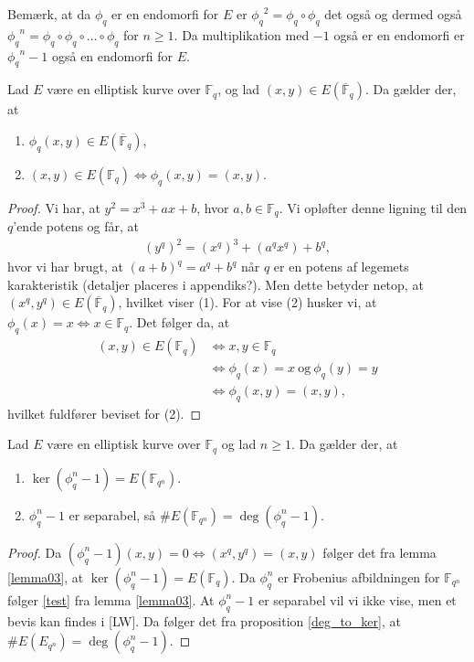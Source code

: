 Bemærk, at da $\phi_q$ er en endomorfi for $E$ er ${\phi_q}^2 = \phi_q \circ \phi_q$ det også og dermed også 
${\phi_q}^n = \phi_q \circ \phi_q \circ \ldots \circ \phi_q$ for $n \geq 1$. Da multiplikation med $-1$ også er en endomorfi er ${\phi_q}^n - 1$ også en endomorfi for $E$.

\begin{lemma}
\label{lemma03}
Lad $E$ være en elliptisk kurve over $\mathbb{F}_q$, og lad 
$(x, y) \in E(\overline{\mathbb{F}}_q)$. Da gælder der, at 
\begin{enumerate}
	\item $\phi_q(x, y) \in E(\overline{\mathbb{F}}_q)$,
	\item $(x, y) \in E(\mathbb{F}_q) \Leftrightarrow \phi_q(x, y)=(x, y)$.
\end{enumerate}
\end{lemma}
\begin{proof}
Vi har, at $y^2 = x^3 + ax + b$, hvor $a, b \in \mathbb{F}_q$. Vi opløfter 
denne ligning til den $q$'ende potens og får, at 
\begin{align*}
	(y^q)^2 = (x^q)^3 + (a^q x^q) + b^q,
\end{align*}
hvor vi har brugt, at $(a+b)^q = a^q + b^q$ når $q$ er en potens af legemets karakteristik 
(detaljer placeres i appendiks?).
Men dette betyder netop, at 
$(x^q, y^q) \in E(\overline{\mathbb{F}}_q)$, hvilket viser (1).
For at vise (2) husker vi, at $\phi_q(x) = x \Leftrightarrow x \in \mathbb{F}_q$.
Det følger da, at 
\begin{align*}
	(x, y) \in E(\mathbb{F}_q) &\Leftrightarrow x, y \in \mathbb{F}_q \\
	&\Leftrightarrow \phi_q(x) = x \ \text{og} \ \phi_q(y) = y \\
	&\Leftrightarrow \phi_q(x, y) = (x, y),
\end{align*}
hvilket fuldfører beviset for (2).
\end{proof}

\begin{proposition}
\label{prop_imp}
Lad $E$ være en elliptisk kurve over $\mathbb{F}_q$ og lad $n \geq 1$. Da gælder der,
at 
\begin{enumerate}
	\item $\ker (\phi_{q}^n - 1) = E(\mathbb{F}_{q^n})$. \label{test}
	\item $\phi_{q}^{n}-1$ er separabel, så $\#E(\mathbb{F}_{q^n})=\deg (\phi_{q}^{n}-1)$. 
\end{enumerate}
\end{proposition}
\begin{proof}
Da $(\phi_{q}^{n} - 1)(x,y) = 0 \Leftrightarrow (x^q, y^q) = (x, y)$ følger det fra
lemma \ref{lemma03}, at $\ker(\phi_{q}^{n}-1)=E(\mathbb{F}_q)$.
Da $\phi_{q}^{n}$ er Frobenius afbildningen for $\mathbb{F}_{q^n}$ følger \eqref{test} fra lemma \ref{lemma03}. At $\phi_{q}^{n} -1$ er separabel vil vi ikke vise, men et bevis kan findes
i [LW]. Da følger det fra proposition \ref{deg_to_ker}, at $\#E(E_{q^n})=\deg(\phi_{q}^{n} -1)$.
\end{proof}

